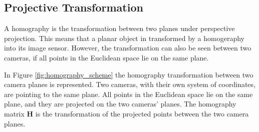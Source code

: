 \subsection{Projective Transformation}
A homography is the transformation between two planes under perspective projection.
This means that a planar object in transformed by a homogeraphy into its image 
sensor.
However, the transformation can also be seen between two cameras, if all points 
in the Euclidean space lie on the same plane.

In Figure \ref{fig:homography_scheme} the homography transformation between two 
camera planes is represented. Two cameras, with their own system of coordinates, 
are pointing to the same plane. All points in the Euclidean space lie on the 
same plane, and they are projected on the two cameras' planes. The homography 
matrix $\boldsymbol{H}$ is the transformation of the projected points between 
the two camera planes.

